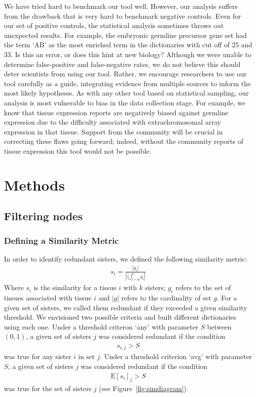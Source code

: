 \documentclass[linenumbers, doublespacing]{bmcart}
\begin{document}
We have tried hard to benchmark our tool well. However, our analysis suffers from the drawback that is very hard to benchmark negative controls. Even for our set of positive controls, the statistical analysis sometimes throws out unexpected results. For example, the embryonic germline precursor gene set had the term `AB' as the most enriched term in the dictionaries with cut off of 25 and 33. Is this an error, or does this hint at new biology? Although we were unable to determine false-positive and false-negative rates, we  do not believe this should deter scientists from using our tool. Rather, we encourage researchers to use our tool carefully as a guide, integrating evidence from multiple sources to inform the most likely hypotheses. As with any other tool based on statistical sampling, our analysis is most vulnerable to bias in the data collection stage. For example, we know that tissue expression reports are negatively biased against germline expression due to the difficulty associated with extrachromosomal array expression in that tissue. Support from the community will be crucial in correcting these flaws going forward; indeed, without the community reports of tissue expression this tool would not be possible.

\section*{Methods}
\subsection*{Filtering nodes}
\subsubsection*{Defining a Similarity Metric}
In order to identify redundant sisters, we defined the following similarity metric:
\begin{eqnarray}\label{similarity def}
	s_i = \frac{|g_i|}{|\bigcup_{i= 0}^k g_i|}
\end{eqnarray}
Where $s_i$ is the similarity for a tissue $i$ with $k$ sisters; $g_i$ refers to the set of tissues associated with tissue $i$ and $|g|$ refers to the cardinality of set $g$. For a given set of sisters, we called them redundant if they exceeded a given similarity threshold. We envisioned two possible criteria and built different dictionaries using each one. Under a threshold criteron `any' with parameter $S$ between $(0, 1)$, a given set of sisters $j$ was considered redundant if the condition
\begin{eqnarray}\label{any threshold}
	s_{i, j} > S
\end{eqnarray}
was true for any sister $i$ in set $j$. Under a threshold criterion `avg' with parameter $S$, a given set of sisters $j$ was considered redundant if the condition
\begin{eqnarray}\label{avg threshold}
	\mathrm{E}[s_i]_j > S
\end{eqnarray}
was true for the set of sisters $j$ (see Figure~\ref{fig:simdiagram}).
\end{document}
